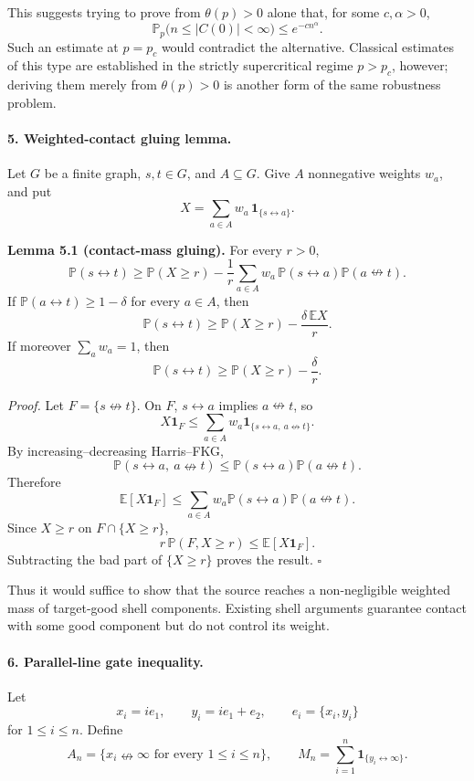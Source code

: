 \documentclass[11pt]{article}
\newcommand{\one}{\mathbf 1}
\begin{document}
This suggests trying to prove from \(\theta(p)>0\) alone that, for some \(c,\alpha>0\),
\[
\mathbb P_p\bigl(n\le |C(0)|<\infty\bigr)\le e^{-c n^\alpha}.
\]
Such an estimate at \(p=p_c\) would contradict the alternative. Classical estimates of this type are established in the strictly supercritical regime \(p>p_c\), however; deriving them merely from \(\theta(p)>0\) is another form of the same robustness problem.

\paragraph{5. Weighted-contact gluing lemma.}
Let \(G\) be a finite graph, \(s,t\in G\), and \(A\subseteq G\). Give \(A\) nonnegative weights \(w_a\), and put
\[
X=\sum_{a\in A}w_a\,\one_{\{s\leftrightarrow a\}}.
\]

\textbf{Lemma 5.1 (contact-mass gluing).}
For every \(r>0\),
\[
\boxed{
\mathbb P(s\leftrightarrow t)
\ge
\mathbb P(X\ge r)
-\frac1r\sum_{a\in A}
w_a\,\mathbb P(s\leftrightarrow a)\mathbb P(a\nleftrightarrow t).
}
\tag{5.1}\label{eq:contactmass}
\]
If \(\mathbb P(a\leftrightarrow t)\ge1-\delta\) for every \(a\in A\), then
\[
\mathbb P(s\leftrightarrow t)
\ge
\mathbb P(X\ge r)-\frac{\delta\,\mathbb EX}{r}.
\]
If moreover \(\sum_aw_a=1\), then
\[
\boxed{
\mathbb P(s\leftrightarrow t)
\ge
\mathbb P(X\ge r)-\frac{\delta}{r}.
}
\tag{5.2}
\]

\emph{Proof.}
Let \(F=\{s\nleftrightarrow t\}\). On \(F\), \(s\leftrightarrow a\) implies \(a\nleftrightarrow t\), so
\[
X\one_F
\le
\sum_{a\in A}w_a\one_{\{s\leftrightarrow a,\ a\nleftrightarrow t\}}.
\]
By increasing--decreasing Harris--FKG,
\[
\mathbb P(s\leftrightarrow a,\ a\nleftrightarrow t)
\le
\mathbb P(s\leftrightarrow a)\mathbb P(a\nleftrightarrow t).
\]
Therefore
\[
\mathbb E[X\one_F]
\le
\sum_{a\in A}w_a\mathbb P(s\leftrightarrow a)\mathbb P(a\nleftrightarrow t).
\]
Since \(X\ge r\) on \(F\cap\{X\ge r\}\),
\[
r\,\mathbb P(F,X\ge r)\le\mathbb E[X\one_F].
\]
Subtracting the bad part of \(\{X\ge r\}\) proves the result. \hfill\(\square\)

Thus it would suffice to show that the source reaches a non-negligible weighted mass of target-good shell components. Existing shell arguments guarantee contact with some good component but do not control its weight.

\paragraph{6. Parallel-line gate inequality.}
Let
\[
x_i=i e_1,\qquad y_i=i e_1+e_2,\qquad e_i=\{x_i,y_i\}
\]
for \(1\le i\le n\). Define
\[
A_n=\{x_i\nleftrightarrow\infty\text{ for every }1\le i\le n\},
\qquad
M_n=\sum_{i=1}^n\one_{\{y_i\leftrightarrow\infty\}}.
\]
\end{document}
